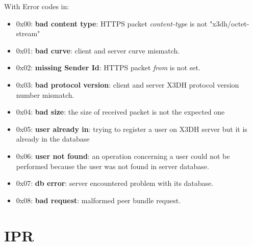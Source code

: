 \documentclass[a4paper,11pt]{article}
\begin{document}
    With Error codes in:
    \begin{itemize}
      \item 0x00: \textbf{bad content type}: HTTPS packet \textit{content-type} is not "x3dh/octet-stream"
      \item 0x01: \textbf{bad curve}: client and server curve mismatch.
      \item 0x02: \textbf{missing Sender Id}: HTTPS packet \textit{from} is not set.
      \item 0x03: \textbf{bad protocol version}: client and server X3DH protocol version number mismatch.
      \item 0x04: \textbf{bad size}: the size of received packet is not the expected one
      \item 0x05: \textbf{user already in}: trying to register a user on X3DH server but it is already in the database
      \item 0x06: \textbf{user not found}: an operation concerning a user could not be performed because the user was not found in server database.
      \item 0x07: \textbf{db error}: server encountered problem with its database.
      \item 0x08: \textbf{bad request}: malformed peer bundle request.
    \end{itemize}
\section{IPR}
\end{document}
